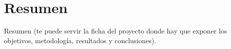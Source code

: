 \chapter*{Resumen}
\label{cha:abs}

Resumen (te puede servir la ficha del proyecto donde hay que exponer los objetivos, metodología, resultados y conclusiones).

\cleardoublepage
